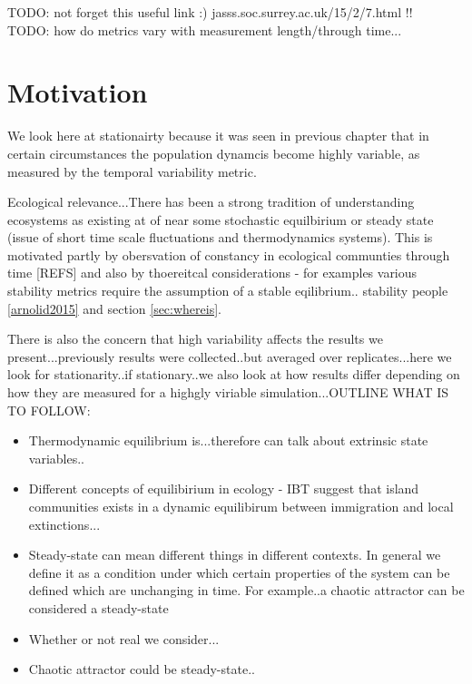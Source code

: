 TODO: not forget this useful link :) jasss.soc.surrey.ac.uk/15/2/7.html !!
\\
TODO: how do metrics vary with measurement length/through time...


\section{Motivation}
\label{sec:motivate_stationarity}

We look here at stationairty because it was seen in previous chapter that in certain circumstances the population dynamcis become highly variable, as measured by the temporal variability metric.  

Ecological relevance...There has been a strong tradition of understanding ecosystems as existing at of near some stochastic equilbirium or steady state \cite{brock1967ecosystem} (issue of short time scale fluctuations and thermodynamics systems). This is motivated partly by obersvation of constancy in ecological communties through time [REFS] and also by thoereitcal considerations - for examples various stability metrics require the assumption of a stable eqilibrium.. stability people \ref{arnolid2015} and section \ref{sec:whereis}. 

There is also the concern that high variability affects the results we present...previously results were collected..but averaged over replicates...here we look for stationarity..if stationary..we also look at how results differ depending on how they are measured for a highgly viriable simulation...OUTLINE WHAT IS TO FOLLOW:

\begin{itemize}
	\item Thermodynamic equilibrium is...therefore can talk about extrinsic state variables..
	\item Different concepts of equilibirium in ecology - IBT suggest that island communities exists in a dynamic equilibirum between immigration and local extinctions..\cite{simberloff1974equilibrium}.
	\item Steady-state can mean different things in different contexts. In general we define it as a condition under which certain properties of the system can be defined which are unchanging in time. For example..a chaotic attractor can be considered a steady-state
	\item Whether or not real we consider... 
	\item Chaotic attractor could be steady-state..
\end{itemize}



